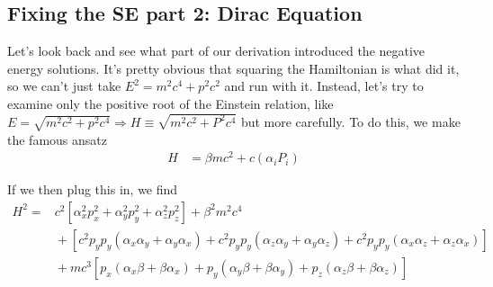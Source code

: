 \documentclass[12pt]{article}
\begin{document}
\subsection{Fixing the SE part 2: Dirac Equation}

Let's look back and see what part of our derivation introduced the negative energy solutions. It's pretty obvious that squaring the Hamiltonian is what did it, so we can't just take $E^2 = m^2c^4 + p^2c^2$ and run with it. Instead, let's try to examine only the positive root of the Einstein relation, like$E = \sqrt{m^2c^2 + p^2c^4} \Rightarrow H \equiv \sqrt{m^2c^2 + P^2c^4}$ but more carefully. To do this, we make the famous ansatz
\begin{align}
    H &= \beta mc^2 + c\left( \alpha_i P_i \right)
\end{align}

If we then plug this in, we find
\begin{align}
    H^2 =& c^2\left[ \alpha_x^2p_x^2 +\alpha_y^2p_y^2+\alpha_z^2p_z^2 \right] + \beta^2 m^2c^4 \nonumber\\
    &{}+ \left[ c^2 p_yp_y(\alpha_x\alpha_y+ \alpha_y\alpha_x) + c^2 p_yp_y(\alpha_z\alpha_y+ \alpha_y\alpha_z) + c^2 p_yp_y(\alpha_x\alpha_z+ \alpha_z\alpha_x) \right]\nonumber\\
    &{}+ mc^3\left[p_x(\alpha_x\beta + \beta \alpha_x) + p_y(\alpha_y\beta + \beta \alpha_y) + p_z(\alpha_z\beta + \beta \alpha_z)\right]
\end{align}
\end{document}
